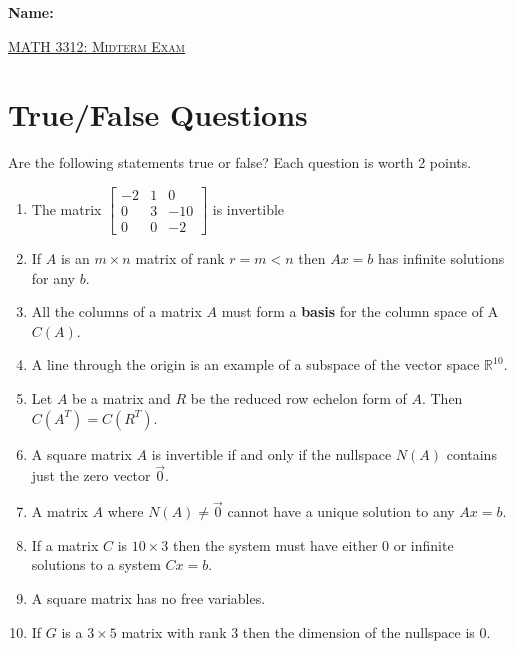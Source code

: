 \documentclass[12pt, a4paper]{article}
\theoremstyle{break}
\begin{document}
\begin{flushleft}
\Large \textbf{Name: } \underline{\hspace{8cm}} \\
\end{flushleft}
\vspace{0.25in}
\begin{center}
{\Large \textsc{\underline{MATH 3312: Midterm Exam}}}
\vspace{0.125in}
\end{center}
\section{True/False Questions}
Are the following statements true or false? Each question is worth 2 points. 
\begin{enumerate}
\item \underline{\hspace{1cm}} The matrix $
\begin{bmatrix}
-2 & 1 & 0 \\
0 &3 &-10 \\
0 & 0 & -2 
\end{bmatrix} $ is invertible
\item \underline{\hspace{1cm}}  If $A$ is an $m\times n$ matrix of rank $r=m<n$ then $Ax=b$ has infinite solutions for any $b$. 
\item \underline{\hspace{1cm}} All the columns of a matrix $A$ must form a \textbf{basis} for the column space of A $C(A)$. 
\item \underline{\hspace{1cm}} A line through the origin is an example of a subspace of the vector space $\mathbb{R}^{10}$. 
\item \underline{\hspace{1cm}} Let $A$ be a matrix and $R$ be the reduced row echelon form of $A$. Then $C(A^T)=C(R^T)$.  
\item \underline{\hspace{1cm}} A square matrix $A$ is invertible if and only if the nullspace $N(A)$ contains just the zero vector $\vec{0}$. 
\item  \underline{\hspace{1cm}} A matrix $A$ where $N(A) \neq \vec{0}$ cannot have a unique solution to any $Ax=b$. 
\item  \underline{\hspace{1cm}} If a matrix $C$ is $10 \times 3$ then the system must have either 0 or infinite solutions to a system $Cx=b$. 
\item  \underline{\hspace{1cm}} A square matrix has no free variables. 
\item  \underline{\hspace{1cm}} If $G$ is a $3 \times 5$ matrix with rank $3$ then the dimension of the nullspace is $0$. 
\end{enumerate}
\newpage
\end{document}
